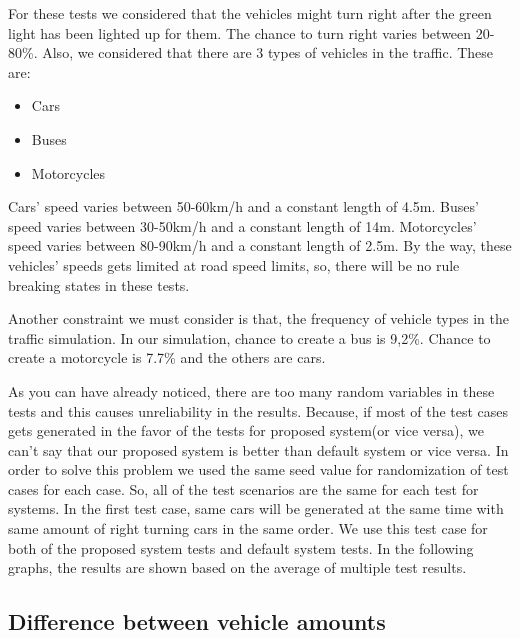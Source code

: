 \documentclass[conference]{IEEEtran}
\begin{document}
For these tests we considered that the vehicles might turn right after the green light has been lighted up for them. The chance to turn right varies between 20-80\%.\cite{b1} Also, we considered that there are 3 types of vehicles in the traffic. 
These are:
\begin{itemize}
	\item Cars
	\item Buses
	\item Motorcycles
\end{itemize} 
Cars' speed varies between 50-60km/h and a constant length of 4.5m.\cite{b3} Buses' speed varies between 30-50km/h and a constant length of 14m\cite{b2}. Motorcycles' speed varies between 80-90km/h and a constant length of 2.5m.\cite{b4} By the way, these vehicles' speeds gets limited at road speed limits, so, there will be no rule breaking states in these tests.

\par Another constraint we must consider is that, the frequency of vehicle types in the traffic simulation. In our simulation, chance to create a bus is 9,2\%.\cite{b5} Chance to create a motorcycle is 7.7\%\cite{b5} and the others are cars. 
    
As you can have already noticed, there are too many random variables in these tests and this causes unreliability in the results. Because, if most of the test cases gets generated in the favor of the tests for proposed system(or vice versa), we can't say that our proposed system is better than default system or vice versa. In order to solve this problem we used the same seed value for randomization of test cases for each case. So, all of the test scenarios are the same for each test for systems. In the first test case, same cars will be generated at the same time with same amount of right turning cars in the same order. We use this test case for both of the proposed system tests and default system tests.
In the following graphs, the results are shown based on the average of multiple test results.
\subsection{Difference between vehicle amounts}
\end{document}
